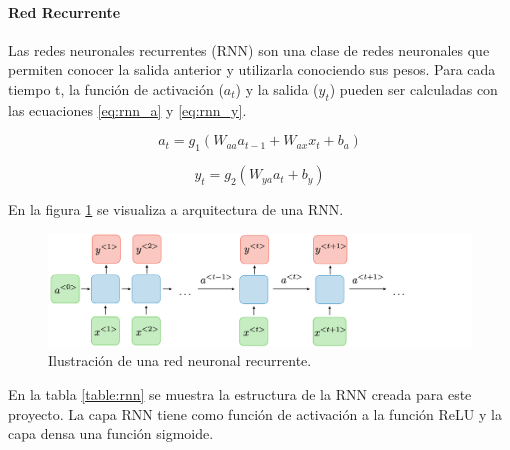 \paragraph{Red Recurrente}
Las redes neuronales recurrentes (RNN) son una clase de redes neuronales que permiten conocer la salida anterior y utilizarla conociendo sus pesos. Para cada tiempo t, la función de activación ($a_t$) y la salida ($y_t$) pueden ser calculadas con las ecuaciones \ref{eq:rnn_a} y \ref{eq:rnn_y}.

\begin{minipage}{0.47\linewidth}

	\begin{equation}
		a_t = g_1(W_{aa}a_{t-1}+W_{ax}x_t+b_a)
		\label{eq:rnn_a}
	\end{equation}

\end{minipage}
\hspace{0.1cm}
\begin{minipage}{0.47\linewidth}

	\begin{equation}
		y_t = g_2(W_{ya}a_t+b_y)
		\label{eq:rnn_y}
	\end{equation}

\end{minipage}

En la figura \ref{fig:rnn} se visualiza a arquitectura de una RNN.

\begin{figure}[H]
	\centering
	\hspace*{2cm}
	\includegraphics[width=15cm]{Graphics/rnn.png}
	\caption{Ilustración de una red neuronal recurrente\cite{rnn_image}.}
	\label{fig:rnn}
\end{figure}

En la tabla \ref{table:rnn} se muestra la estructura de la RNN creada para este proyecto. La capa RNN tiene como función de activación a la función ReLU y la capa densa una función sigmoide.

